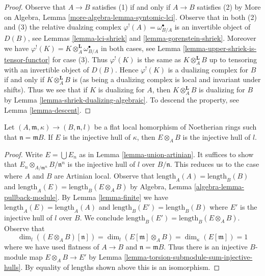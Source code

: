\begin{proof}
Observe that $A \to B$ satisfies (1) if and only if $A \to B$
satisfies (2) by  More on Algebra, Lemma \ref{more-algebra-lemma-syntomic-lci}.
Observe that in both (2) and (3) the relative dualzing
complex $\varphi^!(A) = \omega_{B/A}^\bullet$ is an invertible
object of $D(B)$, see
Lemmas \ref{lemma-lci-shriek} and \ref{lemma-gorenstein-shriek}.
Moreover we have
$\varphi^!(K) = K \otimes_A^\mathbf{L} \omega_{B/A}^\bullet$
in both cases, see Lemma \ref{lemma-upper-shriek-is-tensor-functor}
for case (3).
Thus $\varphi^!(K)$ is the same as $K \otimes_A^\mathbf{L} B$
up to tensoring with an invertible object of $D(B)$.
Hence $\varphi^!(K)$ is a dualizing complex for $B$
if and only if $K \otimes_A^\mathbf{L} B$ is
(as being a dualizing complex is local and invariant under shifts).
Thus we see that if $K$ is dualizing for $A$, then
$K \otimes_A^\mathbf{L} B$ is dualizing for $B$ by
Lemma \ref{lemma-shriek-dualizing-algebraic}.
To descend the property, see
Lemma \ref{lemma-descent}.
\end{proof}

\begin{lemma}
\label{lemma-injective-hull-goes-up}
Let $(A, \mathfrak m, \kappa) \to (B, \mathfrak n, l)$
be a flat local homorphism of Noetherian rings such that
$\mathfrak n = \mathfrak m B$. If $E$ is the injective
hull of $\kappa$, then $E \otimes_A B$ is the injective
hull of $l$.
\end{lemma}

\begin{proof}
Write $E = \bigcup E_n$ as in Lemma \ref{lemma-union-artinian}.
It suffices to show that $E_n \otimes_{A/\mathfrak m^n} B/\mathfrak n^n$
is the injective hull of $l$ over $B/\mathfrak n$.
This reduces us to the case where $A$ and $B$ are Artinian local.
Observe that $\text{length}_A(A) = \text{length}_B(B)$ and
$\text{length}_A(E) = \text{length}_B(E \otimes_A B)$
by Algebra, Lemma \ref{algebra-lemma-pullback-module}.
By Lemma \ref{lemma-finite} we have
$\text{length}_A(E) = \text{length}_A(A)$ and
$\text{length}_B(E') = \text{length}_B(B)$
where $E'$ is the injective hull of $l$ over $B$.
We conclude $\text{length}_B(E') = \text{length}_B(E \otimes_A B)$.
Observe that
$$
\dim_l((E \otimes_A B)[\mathfrak n]) =
\dim_l(E[\mathfrak m] \otimes_A B) =
\dim_\kappa(E[\mathfrak m]) = 1
$$
where we have used flatness of $A \to B$ and $\mathfrak n = \mathfrak mB$.
Thus there is an injective $B$-module map $E \otimes_A B \to E'$
by Lemma \ref{lemma-torsion-submodule-sum-injective-hulls}.
By equality of lengths shown above this is an isomorphism.
\end{proof}

